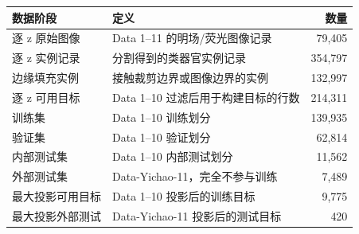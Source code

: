 \begin{tabular}{@{}llr@{}}
\toprule
数据阶段 & 定义 & 数量 \\
\midrule
逐 z 原始图像 & Data 1--11 的明场/荧光图像记录 & 79,405 \\
逐 z 实例记录 & 分割得到的类器官实例记录 & 354,797 \\
边缘填充实例 & 接触裁剪边界或图像边界的实例 & 132,997 \\
逐 z 可用目标 & Data 1--10 过滤后用于构建目标的行数 & 214,311 \\
训练集 & Data 1--10 训练划分 & 139,935 \\
验证集 & Data 1--10 验证划分 & 62,814 \\
内部测试集 & Data 1--10 内部测试划分 & 11,562 \\
外部测试集 & Data-Yichao-11，完全不参与训练 & 7,489 \\
\midrule
最大投影可用目标 & Data 1--10 投影后的训练目标 & 9,775 \\
最大投影外部测试 & Data-Yichao-11 投影后的测试目标 & 420 \\
\bottomrule
\end{tabular}
